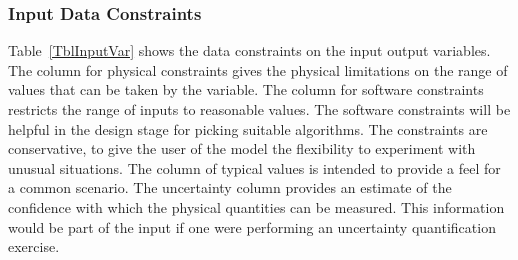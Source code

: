 \documentclass[12pt]{article}
\begin{document}


\subsubsection{Input Data Constraints} \label{sec_DataConstraints}    



Table~\ref{TblInputVar} shows the data constraints on the input output
variables.  The column for physical constraints gives the physical limitations
on the range of values that can be taken by the variable.  The column for
software constraints restricts the range of inputs to reasonable values.  The
software constraints will be helpful in the design stage for picking suitable
algorithms.  The constraints are conservative, to give the user of the model the
flexibility to experiment with unusual situations.  The column of typical values
is intended to provide a feel for a common scenario.  The uncertainty column
provides an estimate of the confidence with which the physical quantities can be
measured.  This information would be part of the input if one were performing an
uncertainty quantification exercise.






\end{document}
